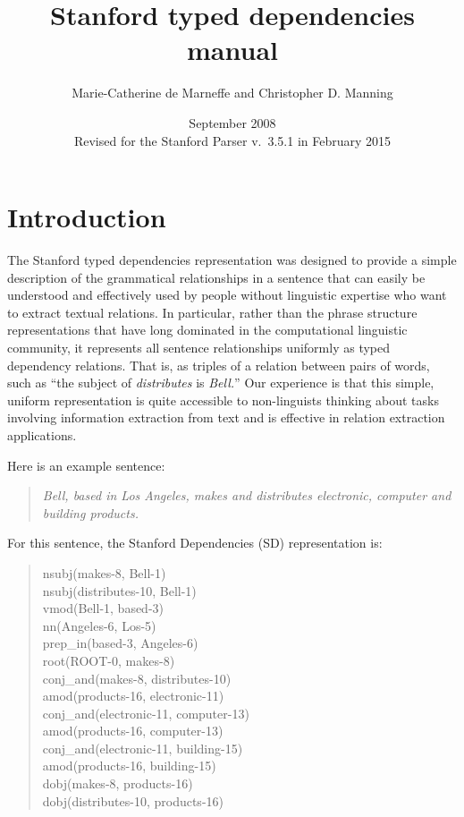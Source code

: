 \documentclass[11pt,letterpaper]{article}
\title{\textbf{Stanford typed dependencies manual}}
\author{Marie-Catherine de Marneffe and Christopher D. Manning}
\date{September 2008\\
Revised for the Stanford Parser v.\ 3.5.1 in February 2015
}
\begin{document}
\maketitle

\section{Introduction}

The Stanford typed dependencies representation was designed to provide
a simple description of the grammatical relationships in a sentence
that can easily be understood and effectively used by people without
linguistic expertise who want to extract textual relations.  In
particular, rather than the phrase structure representations that have
long dominated in the computational linguistic community, it
represents all sentence relationships uniformly as typed dependency
relations. That is, as triples of a relation between pairs of words, such as ``the subject of
\emph{distributes} is \emph{Bell.}''  Our experience is that this simple,
uniform representation is quite accessible to non-linguists
thinking about tasks involving information extraction from text and is
effective in relation extraction applications.

Here is an example sentence:
\begin{quote}
\emph{Bell, based in Los Angeles, makes and distributes electronic, computer and building products.}
\end{quote}
For this sentence, the Stanford Dependencies (SD) representation is:
\begin{quote}
nsubj(makes-8, Bell-1) \\
nsubj(distributes-10, Bell-1) \\
vmod(Bell-1, based-3) \\
nn(Angeles-6, Los-5) \\
prep\_in(based-3, Angeles-6) \\
root(ROOT-0, makes-8)\\
conj\_and(makes-8, distributes-10) \\
amod(products-16, electronic-11) \\
conj\_and(electronic-11, computer-13) \\
amod(products-16, computer-13) \\
conj\_and(electronic-11, building-15) \\
amod(products-16, building-15) \\
dobj(makes-8, products-16) \\
dobj(distributes-10, products-16)
\end{quote}
\end{document}
